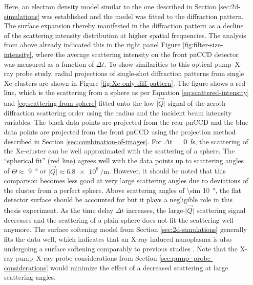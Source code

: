 Here, an electron density model similar to the one described in Section \ref{sec:2d-simulations} was established and the model was fitted to the diffraction pattern. The surface expansion thereby manifested in the diffraction pattern as a decline of the scattering intensity distribution at higher spatial frequencies. The analysis from above already indicated this in the right panel Figure \ref{fig:filter-size-intensity}, where the average scattering intensity on the front pnCCD detector was measured as a function of $\Delta t$. To show similarities to this optical pump--X-ray probe study, radial projections of single-shot diffraction patterns from single Xe-clusters are shown in Figure \ref{fig:Xe-only-diff-pattern}. The figure shows a red line, which is the scattering from a sphere as per Equation \eqref{eq:scattered-intensity} and \eqref{eq:scattering from sphere} fitted onto the low-$\lvert\vec{Q}\rvert$ signal of the zeroth diffraction scattering order using the radius and the incident beam intensity variables. The black data points are projected from the rear pnCCD and the blue data points are projected from the front pnCCD using the projection method described in Section \ref{sec:combination-of-images}. For $\Delta t=$ \SI{0}{\femto\second}, the scattering of the Xe-cluster can be well approximated with the scattering of a sphere. The ``spherical fit'' (red line) agrees well with the data points up to scattering angles of $\Theta \approx$ \SI{9}{\degree} or $\lvert\vec{Q}\rvert\approx\SI{6.8e8}{\per\meter}$. However, it should be noted that this comparison becomes less good at very large scattering angles due to deviations of the cluster from a perfect sphere. Above scattering angles of \SI{\sim 10}{\degree}, the flat detector surface should be accounted for \citep{Bostedt-2012-PRL} but it plays a negligible role in this thesis experiment. As the time delay $\Delta t$ increases, the large-$\lvert\vec{Q}\rvert$ scattering signal decreases and the scattering of a plain sphere does not fit the scattering well anymore. The surface softening model from Section \ref{sec:2d-simulations} generally fits the data well, which indicates that an X-ray induced nanoplasma is also undergoing a surface softening comparably to previous studies \cite{Gorkhover-2016-NatPho,Gorkhover-2014-Thesis}. Note that the X-ray pump--X-ray probe considerations from Section \ref{sec:pump--probe-considerations} would minimize the effect of a decreased scattering at large scattering angles.\\[1\baselineskip]
%
%
